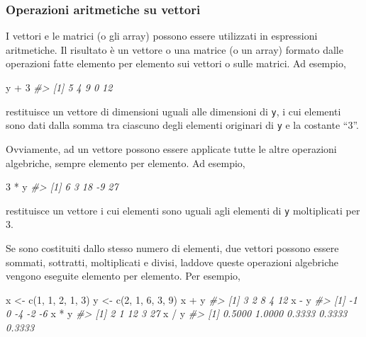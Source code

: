 \documentclass[
  11pt,
]{krantz}
\makeatletter
\newenvironment{Shaded}{\begin{snugshade}}{\end{snugshade}}
\newcommand{\CommentTok}[1]{\textcolor[rgb]{0.37,0.37,0.37}{\textit{#1}}}
\newcommand{\DecValTok}[1]{\textcolor[rgb]{0.06,0.06,0.06}{#1}}
\newcommand{\FunctionTok}[1]{\textcolor[rgb]{0,0,0}{#1}}
\newcommand{\NormalTok}[1]{#1}
\newcommand{\OtherTok}[1]{\textcolor[rgb]{0.37,0.37,0.37}{#1}}
\newcommand{\SpecialCharTok}[1]{\textcolor[rgb]{0,0,0}{#1}}
\newenvironment{kframe}{%
\medskip{}
\setlength{\fboxsep}{.8em}
 \def\at@end@of@kframe{}%
 \ifinner\ifhmode%
  \def\at@end@of@kframe{\end{minipage}}%
  \begin{minipage}{\columnwidth}%
 \fi\fi%
 \def\FrameCommand##1{\hskip\@totalleftmargin \hskip-\fboxsep
 \colorbox{shadecolor}{##1}\hskip-\fboxsep
     \hskip-\linewidth \hskip-\@totalleftmargin \hskip\columnwidth}%
 \MakeFramed {\advance\hsize-\width
   \@totalleftmargin\z@ \linewidth\hsize
   \@setminipage}}%
 {\par\unskip\endMakeFramed%
 \at@end@of@kframe}
\renewenvironment{Shaded}{\begin{kframe}}{\end{kframe}}
\theoremstyle{definition}
\theoremstyle{definition}
\theoremstyle{definition}
\theoremstyle{definition}
\theoremstyle{remark}
\makeatother
\begin{document}
\hypertarget{operazioni-aritmetiche-su-vettori}{%
\subsubsection{Operazioni aritmetiche su vettori}\label{operazioni-aritmetiche-su-vettori}}

I vettori e le matrici (o gli array) possono essere utilizzati in espressioni aritmetiche. Il risultato è un vettore o una matrice (o un array) formato dalle operazioni fatte elemento per elemento sui vettori o sulle matrici. Ad esempio,

\begin{Shaded}
\begin{Highlighting}[]
\NormalTok{y }\SpecialCharTok{+} \DecValTok{3}
\CommentTok{\#\textgreater{} [1]  5  4  9  0 12}
\end{Highlighting}
\end{Shaded}

restituisce un vettore di dimensioni uguali alle dimensioni di \texttt{y}, i cui elementi sono dati dalla somma tra ciascuno degli elementi originari di \texttt{y} e la costante ``3''.

Ovviamente, ad un vettore possono essere applicate tutte le altre operazioni algebriche, sempre elemento per elemento. Ad esempio,

\begin{Shaded}
\begin{Highlighting}[]
\DecValTok{3} \SpecialCharTok{*}\NormalTok{ y}
\CommentTok{\#\textgreater{} [1]  6  3 18 {-}9 27}
\end{Highlighting}
\end{Shaded}

restituisce un vettore i cui elementi sono uguali agli elementi di \texttt{y} moltiplicati per 3.

Se sono costituiti dallo stesso numero di elementi, due vettori possono essere sommati, sottratti, moltiplicati e divisi, laddove queste operazioni algebriche vengono eseguite elemento per elemento. Per esempio,

\begin{Shaded}
\begin{Highlighting}[]
\NormalTok{x }\OtherTok{\textless{}{-}} \FunctionTok{c}\NormalTok{(}\DecValTok{1}\NormalTok{, }\DecValTok{1}\NormalTok{, }\DecValTok{2}\NormalTok{, }\DecValTok{1}\NormalTok{, }\DecValTok{3}\NormalTok{)}
\NormalTok{y }\OtherTok{\textless{}{-}} \FunctionTok{c}\NormalTok{(}\DecValTok{2}\NormalTok{, }\DecValTok{1}\NormalTok{, }\DecValTok{6}\NormalTok{, }\DecValTok{3}\NormalTok{, }\DecValTok{9}\NormalTok{)}
\NormalTok{x }\SpecialCharTok{+}\NormalTok{ y}
\CommentTok{\#\textgreater{} [1]  3  2  8  4 12}
\NormalTok{x }\SpecialCharTok{{-}}\NormalTok{ y}
\CommentTok{\#\textgreater{} [1] {-}1  0 {-}4 {-}2 {-}6}
\NormalTok{x }\SpecialCharTok{*}\NormalTok{ y}
\CommentTok{\#\textgreater{} [1]  2  1 12  3 27}
\NormalTok{x }\SpecialCharTok{/}\NormalTok{ y}
\CommentTok{\#\textgreater{} [1] 0.5000 1.0000 0.3333 0.3333 0.3333}
\end{Highlighting}
\end{Shaded}
\end{document}
